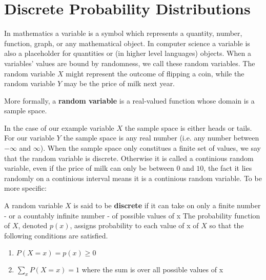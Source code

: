 \chapter{Discrete Probability Distributions}
\label{chapter2}

\par
In mathematics a variable is a symbol which represents a quantity, number, function, graph, or any mathematical object.
In computer science a variable is also a placeholder for quantities or (in higher level languages) objects. When a variables' values
are bound by randomness, we call these random variables. The random variable $X$ might represent the outcome of flipping a coin, while
the random variable $Y$ may be the price of milk next year.\newline \par

More formally, a \textbf{random variable} is a real-valued function whose domain is a sample space.\newline \par

In the case of our example variable $X$ the sample space is either heads or tails. For our variable $Y$ the sample space is any real number
(i.e. any number between $-\infty$ and $\infty$). When the sample space only constitues a finite set of values, we say that the random variable
is discrete. Otherwise it is called a continious random variable, even if the price of milk can only be between $0$ and $10$, the fact it lies randomly on
a continious interval means it is a continious random variable. To be more specific: \newline \par

A random variable $X$ is said to be \textbf{discrete} if it can take on only a finite number - or a countably infinite number - of possible values of x
The probability function of $X$, denoted $p(x)$, assigns probability to each value of x of $X$ so that the following conditions are satisfied.

\begin{enumerate}
	\item $P(X=x) = p(x) \geq 0$
	\item $\sum_{x}P(X=x)=1$ where the sum is over all possible values of x
\end{enumerate}\par

